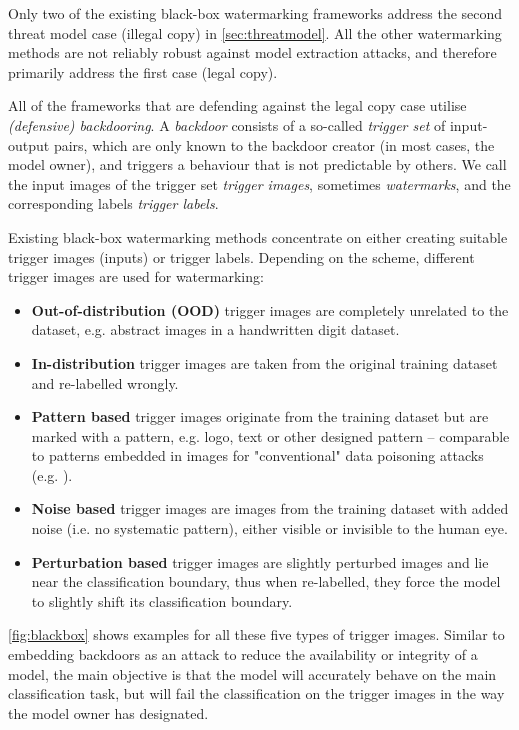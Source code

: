 Only two of the existing black-box watermarking frameworks \cite{jia_entangled_2020, szyller_dawn_2020} address the second threat model case (illegal copy) in \cref{sec:threatmodel}. All the other watermarking methods are not reliably robust against model extraction attacks, and therefore primarily address the first case (legal copy).

All of the frameworks that are defending against the legal copy case utilise \textit{(defensive) backdooring}. A \textit{backdoor} consists of a so-called \textit{trigger set} of input-output pairs, which are only known to the backdoor creator (in most cases, the model owner), and triggers a behaviour that is not predictable by others. We call the input images of the trigger set \textit{trigger images}, sometimes \textit{watermarks}, and the corresponding labels \textit{trigger labels}.

Existing black-box watermarking methods concentrate on either creating suitable trigger images (inputs) or trigger labels. Depending on the scheme, different trigger images are used for watermarking:
\begin{itemize}
    \item \textbf{Out-of-distribution (OOD)} trigger images are completely unrelated to the dataset, e.g. abstract images in a handwritten digit dataset.
    \item \textbf{In-distribution} trigger images are taken from the original training dataset and re-labelled wrongly.
    \item \textbf{Pattern based} trigger images originate from the training dataset but are marked with a pattern, e.g. logo, text or other designed pattern -- comparable to patterns embedded in images for "conventional" data poisoning attacks (e.g. \cite{gu_badnets_2019}).
    \item \textbf{Noise based} trigger images are images from the training dataset with added noise (i.e. no systematic pattern), either visible or invisible to the human eye.
    \item \textbf{Perturbation based} trigger images are slightly perturbed images and lie near the classification boundary, thus when re-labelled, they force the model to slightly shift its classification boundary.
\end{itemize}

\cref{fig:blackbox} shows examples for all these five types of trigger images. 
Similar to embedding backdoors %
as an attack to reduce the availability or integrity of a model, the main objective is that the model will accurately behave on the main classification task, but will fail the classification on the trigger images in the way the model owner has designated.

